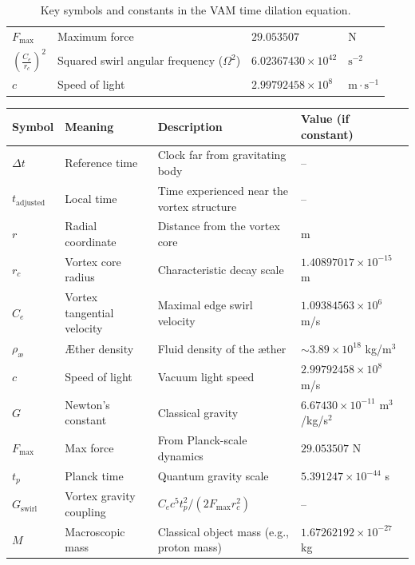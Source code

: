 \begin{table}[h]
\begin{tabular}{llll}
        $F_{\max}$ & Maximum force & $29.053507$ & $\text{N}$ \\
        $\left(\frac{C_e}{r_c}\right)^2$ & Squared swirl angular frequency ($\Omega^2$) & $6.02367430 \times 10^{42}$ & $\text{s}^{-2}$ \\
        $c$ & Speed of light & $2.99792458 \times 10^8$ & $\text{m}\cdot\text{s}^{-1}$ \\
          \bottomrule
      \end{tabular}
    \caption{Key symbols and constants in the VAM time dilation equation.}
      \label{tab:time_dilation_symbols}
  \end{table}

\begin{table}
    \centering
    \begin{tabular}{llll}
        \toprule
        \textbf{Symbol} & \textbf{Meaning} & \textbf{Description} & \textbf{Value (if constant)} \\
        \midrule
        $\Delta t$ & Reference time & Clock far from gravitating body & -- \\
        $t_\text{adjusted}$ & Local time & Time experienced near the vortex structure & -- \\
        $r$ & Radial coordinate & Distance from the vortex core & m \\
        $r_c$ & Vortex core radius & Characteristic decay scale & $1.40897017 \times 10^{-15}$ m \\
        $C_e$ & Vortex tangential velocity & Maximal edge swirl velocity & $1.09384563 \times 10^6$ m/s \\
        $\rho_\text{\ae}$ & Æther density & Fluid density of the æther & $\sim 3.89 \times 10^{18}$ kg/m$^3$ \\
        $c$ & Speed of light & Vacuum light speed & $2.99792458 \times 10^8$ m/s \\
        $G$ & Newton's constant & Classical gravity & $6.67430 \times 10^{-11}$ m$^3$/kg/s$^2$ \\
        $F_{\text{max}}$ & Max force & From Planck-scale dynamics & $29.053507$ N \\
        $t_p$ & Planck time & Quantum gravity scale & $5.391247 \times 10^{-44}$ s \\
        $G_\text{swirl}$ & Vortex gravity coupling & $C_e c^5 t_p^2 / (2 F_{\text{max}} r_c^2)$ & -- \\
        $M$ & Macroscopic mass & Classical object mass (e.g., proton mass) & $1.67262192 \times 10^{-27}$ kg \\

\end{tabular}
\end{table}

